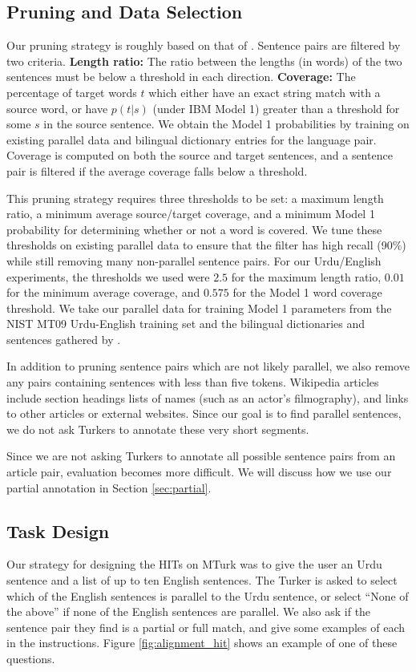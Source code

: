 \subsection{Pruning and Data Selection}
\label{sec:turk_data}
Our pruning strategy is roughly based on that of \citet{Munteanu05}. Sentence
pairs are filtered by two criteria. {\bf Length ratio:} The ratio between the
lengths (in words) of the two sentences must be below a threshold in each
direction. {\bf Coverage:} The percentage of target words $t$ which either have an
exact string match with a source word, or have $p(t|s)$ (under IBM Model 1)
greater than a threshold for some $s$ in the source sentence. We obtain the
Model 1 probabilities by training on existing parallel data and bilingual
dictionary entries for the language pair. Coverage is computed on both the
source and target sentences, and a sentence pair is filtered if the average
coverage falls below a threshold.

This pruning strategy requires three thresholds to be set: a maximum length
ratio, a minimum average source/target coverage, and a minimum Model 1
probability for determining whether or not a word is covered. We tune these
thresholds on existing parallel data to ensure that the filter has high recall
(90\%) while still removing many non-parallel sentence pairs. For our
Urdu/English experiments, the thresholds we used were $2.5$ for the maximum
length ratio, $0.01$ for the minimum average coverage, and $0.575$ for the Model 1
word coverage threshold. We take our parallel data for training Model 1
parameters from the NIST MT09 Urdu-English training set and the
bilingual dictionaries and sentences gathered by \citet{Post12}.

In addition to pruning sentence pairs which are not likely parallel, we also
remove any pairs containing sentences with less than five tokens. Wikipedia
articles include section headings lists of names (such as an actor's
filmography), and links to other articles or external websites. Since our goal
is to find parallel sentences, we do not ask Turkers to annotate these very
short segments.

Since we are not asking Turkers to annotate all possible sentence pairs from an
article pair, evaluation becomes more difficult. We will discuss how we use our
partial annotation in Section \ref{sec:partial}.

\subsection{Task Design}
\label{sec:design}
Our strategy for designing the HITs on MTurk was to give the user an Urdu
sentence and a list of up to ten English sentences. The Turker is asked to
select which of the English sentences is parallel to the Urdu sentence, or
select ``None of the above'' if none of the English sentences are parallel. We
also ask if the sentence pair they find is a partial or full match, and give
some examples of each in the instructions. Figure \ref{fig:alignment_hit} shows
an example of one of these questions.

